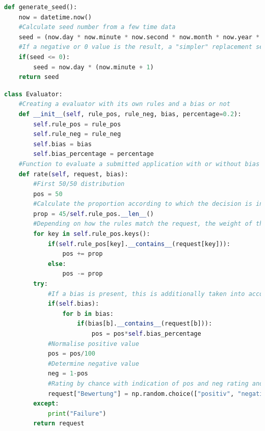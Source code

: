 \documentclass[a4paper,12pt]{report}
\begin{document}
\begin{lstlisting}[language=Python,label={lst:Sz1Z5},caption=Fünfte Zelle Generierung eines zeitabhängigen Seed]
def generate_seed():
    now = datetime.now()
    #Calculate seed number from a few time data
    seed = (now.day * now.minute * now.second * now.month * now.year * now.hour) / now.microsecond 
    #If a negative or 0 value is the result, a "simpler" replacement seed is generated. 
    if(seed <= 0):
        seed = now.day * (now.minute + 1)
    return seed
\end{lstlisting}
\begin{lstlisting}[language=Python,label={lst:Sz1Z6},caption=Sechste Zelle Klasse für das erstellen eines Bewerter Objektes]
class Evaluator:
    #Creating a evaluator with its own rules and a bias or not
    def __init__(self, rule_pos, rule_neg, bias, percentage=0.2):
        self.rule_pos = rule_pos
        self.rule_neg = rule_neg
        self.bias = bias
        self.bias_percentage = percentage
    #Function to evaluate a submitted application with or without bias
    def rate(self, request, bias):
        #First 50/50 distribution
        pos = 50
        #Calculate the proportion according to which the decision is influenced positively or negatively.
        prop = 45/self.rule_pos.__len__()
        #Depending on how the rules match the request, the weight of the positive evaluation is shifted.
        for key in self.rule_pos.keys():
            if(self.rule_pos[key].__contains__(request[key])):
                pos += prop
            else:
                pos -= prop
        try:
            #If a bias is present, this is additionally taken into account with the Parameter in %
            if(self.bias):
                for b in bias:
                    if(bias[b].__contains__(request[b])):
                        pos = pos*self.bias_percentage
            #Normalise positive value
            pos = pos/100
            #Determine negative value
            neg = 1-pos
            #Rating by chance with indication of pos and neg rating and adding the rating to the request. 
            request["Bewertung"] = np.random.choice(["positiv", "negativ"], p=[pos, neg])
        except:
            print("Failure")
        return request
\end{lstlisting}
\end{document}
